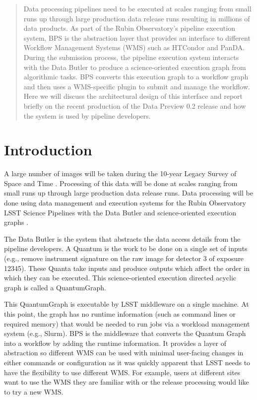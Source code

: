 \documentclass[11pt,twoside]{article}
\begin{document}
\begin{abstract}

Data processing pipelines need to be executed at scales ranging from
small runs up through large production data release runs resulting in
millions of data products.  As part of the Rubin Observatory's pipeline
execution system, BPS is the abstraction layer that provides an interface
to different Workflow Management Systems (WMS) such as HTCondor and PanDA.
During the submission process, the pipeline execution system interacts
with the Data Butler to produce a science-oriented execution graph from
algorithmic tasks.  BPS converts this execution graph to a workflow graph
and then uses a WMS-specific plugin to submit and manage the workflow.
Here we will discuss the architectural design of this interface and
report briefly on the recent production of the Data Preview 0.2 release
and how the system is used by pipeline developers.

\end{abstract}

\section{Introduction}

A large number of images will be taken during the 10-year Legacy Survey
of Space and Time \citep[LSST;][]{2019ApJ...873..111I, I08_adassxxxii}.
Processing of this data will be done at scales ranging from small runs
up through large production data release runs.  Data processing will be
done using data management and execution systems for the Rubin Observatory
LSST Science Pipelines with the Data Butler and science-oriented execution
graphs \citep{C24_adassxxxii,2022SPIE12189E..11J}.

The Data Butler is the system that abstracts the data ac\-cess de\-tails from
the pipe\-line de\-vel\-opers.  A Quantum is the work to be done on a single set
of inputs (e.g., remove instrument signature on the raw image for detector
3 of exposure 12345). These Quanta take inputs and produce outputs which
affect the order in which they can be executed.  This science-oriented
execution directed acyclic graph is called a QuantumGraph.

This QuantumGraph is executable by LSST middleware on a single machine.
At this point, the graph has no runtime information (such as command
lines or required memory) that would be needed to run jobs via
a workload management system (e.g., Slurm).  BPS is the middleware
that converts the Quantum Graph into a workflow by adding the runtime
information. It provides a layer of abstraction so different WMS can be
used with minimal user-facing changes in either commands or configuration
as it was quickly apparent that LSST needs to have the flexibility to
use different WMS. For example, users at different sites want to use
the WMS they are familiar with or the release processing would like to
try a new WMS.
\end{document}
